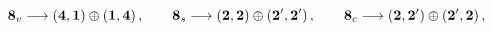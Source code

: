 \begin{equation}
{\bf 8}_v \longrightarrow ({\bf 4},{\bf 1})\oplus ({\bf 1},{\bf 4})\,,\qquad
{\bf 8}_s \longrightarrow ({\bf 2},{\bf 2}) \oplus ({\bf 2'},{\bf 2'})\,,\qquad
{\bf 8}_c \longrightarrow ({\bf 2},{\bf 2'}) \oplus ({\bf 2'},{\bf 2})\,,
\end{equation}

